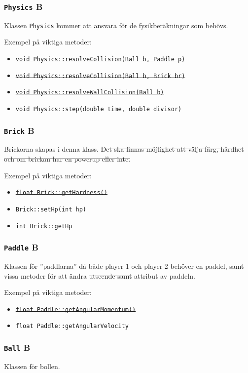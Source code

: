 \documentclass[a4paper,11pt]{article}
\begin{document}
\subsubsection{\texttt{Physics} B}
\noindent Klassen \texttt{Physics} kommer att ansvara för de fysikberäkningar
som behövs. 

\bigskip
\noindent Exempel på viktiga metoder:
\begin{itemize}
\item \sout{\texttt{void Physics::resolveCollision(Ball b, Paddle p)}}
\item \sout{\texttt{void Physics::resolveCollision(Ball b, Brick br)}}
\item \sout{\texttt{void Physics::resolveWallCollision(Ball b)}}
\item \texttt{void Physics::step(double time, double divisor)}
\end{itemize}

\subsubsection{\texttt{Brick} B}
\noindent Brickorna skapas i denna klass. \sout{Det ska finnas möjlighet att välja färg, hårdhet och
om brickan har en powerup eller inte.}

\bigskip
\noindent Exempel på viktiga metoder:
\begin{itemize}
\item \sout{\texttt{float Brick::getHardness()}}
\item \texttt{Brick::setHp(int hp)}
\item \texttt{int Brick::getHp}
\end{itemize}

\subsubsection{\texttt{Paddle} B}
\noindent Klassen för ''paddlarna'' då både player 1 och player 2 behöver en paddel, samt vissa
metoder för att ändra \sout{utseende samt} attribut av paddeln.

\bigskip
\noindent Exempel på viktiga metoder:
\begin{itemize}
\item \sout{\texttt{float Paddle::getAngularMomentum()}}
\item \texttt{float Paddle::getAngularVelocity}
\end{itemize}

\subsubsection{\texttt{Ball} B}
\noindent Klassen för bollen.
\end{document}
